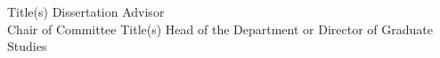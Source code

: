 \begin{committee}
  {Title(s)}
  {Dissertation Advisor\\Chair of Committee}
  {Title(s)}
  {Head of the Department or Director of Graduate Studies}
\end{committee}
